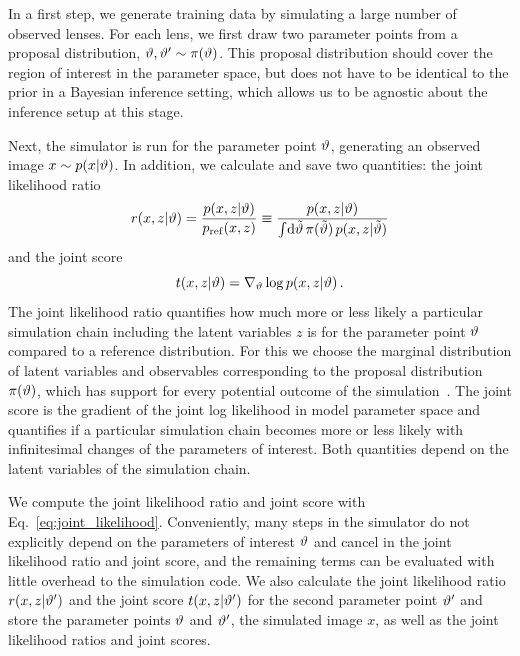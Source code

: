 \documentclass[twocolumn]{aastex62}
\begin{document}
In a first step, we generate training data by simulating a large number of observed lenses. For each lens, we first draw two parameter points from a proposal distribution, $\vartheta, \vartheta' \sim \pi(\vartheta)$. This proposal distribution should cover the region of interest in the parameter space, but does not have to be identical to the prior in a Bayesian inference setting, which allows us to be agnostic about the inference setup at this stage.

Next, the simulator is run for the parameter point $\vartheta$, generating an observed image $x \sim p(x|\vartheta)$. In addition, we calculate and save two quantities: the joint likelihood ratio
%
\begin{equation}
  r(x,z | \stattheta) = \frac {p(x,z | \stattheta)} {p_\mathrm{ref}(x,z)}
  \equiv \frac {p(x,z | \stattheta)} {\int\!\diff\tilde{\stattheta} \, \pi(\tilde{\stattheta}) \, p(x,z | \tilde{\stattheta}) }
\end{equation}
%
and the joint score
%
\begin{equation}
  t(x, z | \stattheta) = \nabla_{\stattheta} \log p(x,z | \stattheta) \,.
\end{equation}
%
The joint likelihood ratio quantifies how much more or less likely a particular simulation chain including the latent variables $z$ is for the parameter point $\vartheta$ compared to a reference distribution. For this we choose the marginal distribution of latent variables and observables corresponding to the proposal distribution $\pi(\vartheta)$, which has support for every potential outcome of the simulation~\citep{Hermans:2019ioj}. The joint score is the gradient of the joint log likelihood in model parameter space and quantifies if a particular simulation chain becomes more or less likely with infinitesimal changes of the parameters of interest. Both quantities depend on the latent variables of the simulation chain.

We compute the joint likelihood ratio and joint score with Eq.~\eqref{eq:joint_likelihood}. Conveniently, many steps in the simulator do not explicitly depend on the parameters of interest $\vartheta$ and cancel in the joint likelihood ratio and joint score, and the remaining terms can be evaluated with little overhead to the simulation code. We also calculate the joint likelihood ratio $r(x,z|\vartheta')$ and the joint score $t(x,z|\vartheta')$ for the second parameter point $\vartheta'$ and store the parameter points $\vartheta$ and $\vartheta'$, the simulated image $x$, as well as the joint likelihood ratios and joint scores.
\end{document}
